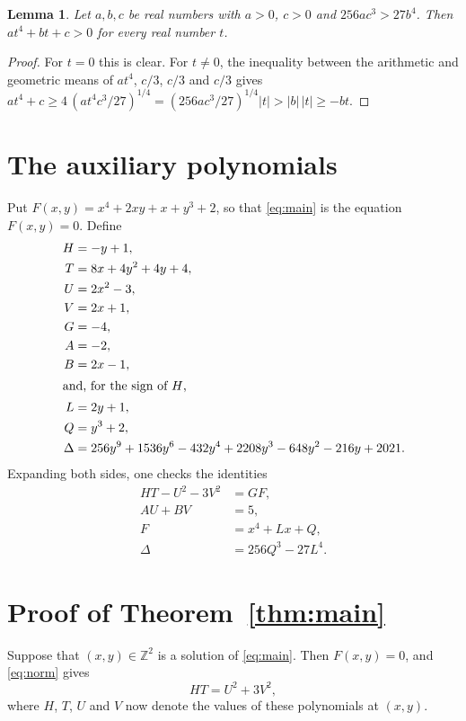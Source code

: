 \documentclass[11pt]{article}
\newtheorem{lemma}[theorem]{Lemma}
\newcommand{\Z}{\mathbb{Z}}
\begin{document}
\begin{lemma}\label{lem:amgm}
Let $a,b,c$ be real numbers with $a>0$, $c>0$ and $256ac^3>27b^4$. Then $at^4+bt+c>0$ for every real number $t$.
\end{lemma}

\begin{proof}
For $t=0$ this is clear. For $t\neq0$, the inequality between the arithmetic and geometric means of $at^4$, $c/3$, $c/3$ and $c/3$ gives $at^4+c\geq4\,(at^4c^3/27)^{1/4}=(256ac^3/27)^{1/4}|t|>|b|\,|t|\geq-bt$.
\end{proof}


\section{The auxiliary polynomials}

Put $F(x,y)=x^{4}+2xy+x+y^{3}+2$, so that \eqref{eq:main} is the equation $F(x,y)=0$. Define
\begin{align*}
H&=-y+1,\\
T&=8x+4y^{2}+4y+4,\\
U&=2x^{2}-3,\\
V&=2x+1,\\
G&=-4,\\
A&=-2,\\
B&=2x-1,\\
\intertext{and, for the sign of $H$,}
L&=2y+1,\\
Q&=y^{3}+2,\\
\Delta&=256y^{9}+1536y^{6}-432y^{4}+2208y^{3}-648y^{2}-216y+2021.
\end{align*}
Expanding both sides, one checks the identities
\begin{align}
HT-U^2-3V^2&=GF,\label{eq:norm}\\
AU+BV&=5,\label{eq:bezout}\\
F&=x^4+Lx+Q,\label{eq:sign}\\
\Delta&=256Q^3-27L^4.\label{eq:signb}
\end{align}

\section{Proof of Theorem~\ref{thm:main}}

Suppose that $(x,y)\in\Z^2$ is a solution of \eqref{eq:main}. Then $F(x,y)=0$, and \eqref{eq:norm} gives
\begin{equation}\label{eq:HT}
HT=U^2+3V^2,
\end{equation}
where $H$, $T$, $U$ and $V$ now denote the values of these polynomials at $(x,y)$.
\end{document}
